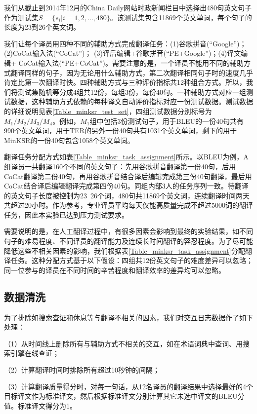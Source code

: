 我们从截止到2014年12月的China Daily网站时政新闻栏目中选择出480句英文句子作为测试集$S=\{ s_i |i=1,2, \ldots ,480 \}$。该测试集包含11869个英文单词，每个句子的长度为23到26个英文词。

我们让每个译员用四种不同的辅助方式完成翻译任务：(1)谷歌拼音(``Google'')；(2)CoCat输入法(``CoCat'')； (3)译后编辑+谷歌拼音(``PE+Google'')；(4)译文编辑+\linebreak
CoCat输入法(``PE+CoCat'')。需要注意的是，一个译员不能用不同的辅助方式翻译同样的句子，因为无论用什么辅助方式，第二次翻译相同句子时的速度几乎肯定比第一次翻译时快。四种辅助方式与三种评价指标共12种组合方式。所以，我们将测试集随机等分成4组共12份，每组3份，每份40句。一种辅助方式对应一组测试数据，这种辅助方式依赖的每种译文自动评价指标对应一份测试数据。测试数据的详细说明见表\ref{Table_minksr_test_set}，四组测试数据分别标号为$M_1/M_2/M_3/M_4$。例如，$M_1$组中包括3份测试句子，用于BLEU的一份40句共有990个英文单词，用于TER的另外一份40句共有1031个英文单词，剩下的用于MinKSR的一份40句包含1058个英文单词。

翻译任务分配方式如表\ref{Table_minksr_task_assignment}所示。以BLEU为例，A组译员一共翻译160个不同的英文句子：先用谷歌拼音翻译第一份40句，后用CoCat翻译第二份40句，再用谷歌拼音结合译后编辑完成第三份40句翻译，最后用CoCat结合译后编辑翻译完成第四份40句。同组内部3人的任务序列一致。待翻译的英文句子长度被控制为23~26个词，480句共11869个英文词，连续翻译时间两天共超过20小时。作为参考，专业译员平均每天仅能高质量完成不超过5000词的翻译任务，因此本实验已达到压力测试要求。

需要说明的是，在人工翻译过程中，有很多因素会影响到最终的实验结果，如不同句子的难易程度、不同译员的翻译能力及连续长时间翻译的容忍程度。为了尽可能降低这些不相关因素的影响，我们根据表\ref{Table_minksr_task_assignment}分配翻译任务。这种分配方式基于以下假设：四组共12份英文句子的难度差异可以忽略；同一位参与的译员在不同时间的辛苦程度和翻译效率的差异均可以忽略。

\subsection{数据清洗}

为了排除如搜索查证和休息等与翻译不相关的因素，我们对交互日志数据作了如下处理：

（1）从时间线上删除所有与辅助方式不相关的交互，如在术语词典中查词、用搜索引擎在线查证；

（2）计算翻译时间时排除所有超过10秒钟的间隔；

（3）计算翻译质量得分时，对每一句话，从12名译员的翻译结果中选择最好的4个目标译文作为标准译文，然后根据标准译文分别计算其它未选中译文的BLEU分值。标准译文得分为1。


